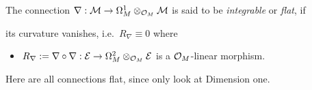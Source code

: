 \begin{defn}
  The connection $\nabla:\mathcal{M}\to \Omega_M^1\otimes_{\mathcal{O}_M}\mathcal{M}$ is said to be
  \emph{integrable} or \emph{flat}, if
  \begin{einr}
    its curvature vanishes, i.e.\ $R_\nabla\equiv0$ where
    \begin{itemize}
      \item $R_\nabla:=\nabla\circ\nabla:\mathcal{E}\to\Omega_M^2\otimes_{\mathcal{O}_M}\mathcal{E}$
        is a $\mathcal{O}_M$-linear morphism.
    \end{itemize}
  \end{einr}
  \begin{comment}
    \begin{s-prop}
      \marginnote{\cite[0.12.4]{sabbah2007isomonodromic}}
      The connection $\nabla$ is flat if and only if, in any local basis $e$ of
      $\cM$, the connection matrix $\Omega$ satisfies
      \[
        d\Omega + \Omega \wedge \Omega = 0.
      \]
      This means that the flatness condition is sufficient to assure the
      existence of local fundamental solutions.
    \end{s-prop}
  \end{comment}
  \begin{s-rem}
    Here are all connections flat, since only look at Dimension one.
    \TODO[cf\dots]
  \end{s-rem}
  \begin{comment}
    We will say that a connection on a meromorphic bundle is \emph{integrable}
    or \emph{flat} if its restriction to $M\backslash Z$ is an integrable
    connection on the holomorphic bundle $\sM_{|M\backslash Z}$.
  \end{comment}
\end{defn}

